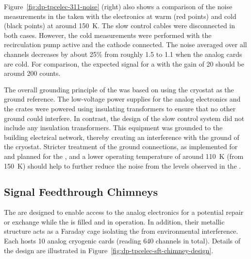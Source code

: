Figure~\ref{fig:dp-tpcelec-311-noise} (right) also shows a comparison of the noise measurements in the  taken with the  electronics at warm (red points) and cold (black points) at around \SI{150}{\kelvin}. The slow control cables were disconnected in both cases. However, the cold measurements were performed with the recirculation pump active and the cathode  connected. 
The \rms noise averaged over all channels decreases by about 25\% from roughly \SI{1.5}{} to \SI{1.1}{} when the  analog cards are cold. For comparison, the expected signal for a  with the  gain of \num{20} should be around \SI{200}{} counts. %

The overall grounding principle of the  was based on %
using the cryostat as the ground reference. The low-voltage power supplies for the  analog electronics and the  crates were powered %
using insulating transformers to ensure that %
no other ground could interfere. %
In contrast, the design of the slow control system did not include any insulation transformers. This equipment was grounded to the building electrical network, thereby creating an interference with the ground of the cryostat. Stricter treatment of the ground connections, as %
implemented for  and planned for the , and a lower  operating temperature of around \SI{110}{\kelvin} (from \SI{150}{\kelvin}) should help to further reduce the noise %
from the levels observed in the .


\subsection{Signal Feedthrough Chimneys}
\label{ssec:dp-tpcelec-design-sft}

The  are designed to enable access to the  analog electronics for a potential repair or exchange while the  is filled and in operation. %
In addition, their metallic structure acts as a Faraday cage isolating the   from environmental interference.  Each  hosts \num{10} analog cryogenic  cards (reading \num{640} channels in total).  %
Details of the design are illustrated in Figure~\ref{fig:dp-tpcelec-sft-chimney-design}. 

